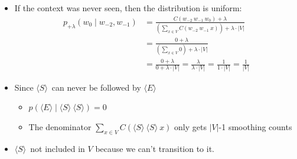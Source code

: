 \documentclass[11pt,letterpaper]{article}
\newcommand{\ngramstart}{\ensuremath{\langle S \rangle}}
\newcommand{\ngramend}{\ensuremath{\langle E \rangle}}
\begin{document}
\begin{itemize}
  \item If the context was never seen, then the distribution is uniform: 
    \begin{align*}
      p_{+\lambda}(w_0 \mid w_{-2}, w_{-1}) &= \frac{C(w_{-2}~w_{-1}~w_{0})+\lambda}{\left(\sum_{x \in V} C(w_{-2}~w_{-1}~x)\right)+ \lambda \cdot |V|} \\
                                 &= \frac{0+\lambda}{\left(\sum_{x \in V} 0\right) + \lambda \cdot |V|} \\
                                 &= \frac{0+\lambda}{0+\lambda \cdot |V|}
                                 = \frac{\lambda}{\lambda \cdot |V|}
                                 = \frac{1}{1 \cdot |V|}
                                 = \frac{1}{|V|}
    \end{align*}
  \item Since \ngramstart\ can never be followed by \ngramend
    \begin{itemize}
      \item $p(\ngramend \mid \ngramstart~\ngramstart) = 0$
      \item The denominator $\sum_{x \in V} C(\ngramstart~\ngramstart~x)$ only gets $|V|$-1 smoothing counts
    \end{itemize}
  \item \ngramstart\ not included in $V$ because we can't transition to it.


\end{itemize}
\end{document}
